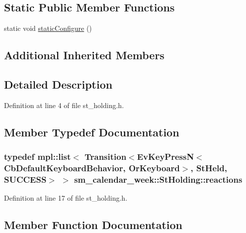 \subsection*{Static Public Member Functions}
\begin{DoxyCompactItemize}
\item 
static void \hyperlink{structsm__calendar__week_1_1StHolding_a817b40ec1972c5610cd1fc752eda81ef}{static\+Configure} ()
\end{DoxyCompactItemize}
\subsection*{Additional Inherited Members}


\subsection{Detailed Description}


Definition at line 4 of file st\+\_\+holding.\+h.



\subsection{Member Typedef Documentation}
\subsubsection[{\texorpdfstring{reactions}{reactions}}]{\setlength{\rightskip}{0pt plus 5cm}typedef mpl\+::list$<$ Transition$<$Ev\+Key\+PressN$<$Cb\+Default\+Keyboard\+Behavior, {\bf Or\+Keyboard}$>$, {\bf St\+Held}, {\bf S\+U\+C\+C\+E\+SS}$>$ $>$ {\bf sm\+\_\+calendar\+\_\+week\+::\+St\+Holding\+::reactions}}\hypertarget{structsm__calendar__week_1_1StHolding_af43d292466f9a5e525ab003b45fb7a96}{}\label{structsm__calendar__week_1_1StHolding_af43d292466f9a5e525ab003b45fb7a96}


Definition at line 17 of file st\+\_\+holding.\+h.



\subsection{Member Function Documentation}
